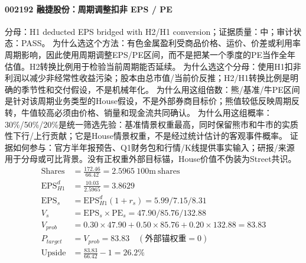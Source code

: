 \paragraph{002192 融捷股份：周期调整扣非 EPS / PE}
分母：H1 deducted EPS bridged with H2/H1 conversion；证据质量：中；审计状态：PASS。
为什么选这个方法：有色金属盈利受商品价格、运价、价差或利用率周期影响，因此使用周期调整EPS/PE区间，而不是把某一个季度的PE当作全年估值。H2转换比例用于检验当前周期能否延续。
为什么选这个分母：使用H1扣非利润以减少非经常性收益污染；股本由总市值/当前价反推；H2/H1转换比例是明确的季节性和交付假设，不是机械年化。
为什么用这组倍数：熊/基准/牛PE区间是针对该周期业务类型的House假设，不是外部券商目标价；熊值较低反映周期反转，牛值较高必须由价格、销量和现金流共同确认。
为什么用这组概率：30\%/50\%/20\%是统一筛选先验：基准情景权重最高，同时保留熊市和牛市的实质性下行/上行贡献；它是House情景权重，不是经过统计估计的客观事件概率。
证据如何参与：官方半年报预告、Q1财务包和行情/K线提供事实输入；研报/来源用于分母或可比背景。没有正权重外部目标锚，House价值不伪装为Street共识。
\begin{align*}
\mathrm{Shares} &= \frac{172.46}{66.42}=2.5965\ \mathrm{100m\ shares}\\
\mathrm{EPS}_{H1}^d &= \frac{10.03}{2.5965}=3.8629\\
\mathrm{EPS}_s &= \mathrm{EPS}_{H1}^d(1+r_s)=5.99/7.15/8.31\\
V_s &= \mathrm{EPS}_s\times \mathrm{PE}_s=47.90/85.76/132.88\\
V_{prob} &= 0.30\times 47.90+0.50\times 85.76+0.20\times 132.88=83.83\\
P_{target} &= V_{prob}=83.83\quad(\text{外部锚权重}=0)\\
\mathrm{Upside} &= \frac{83.83}{66.42}-1=26.2\%\\
\end{align*}

